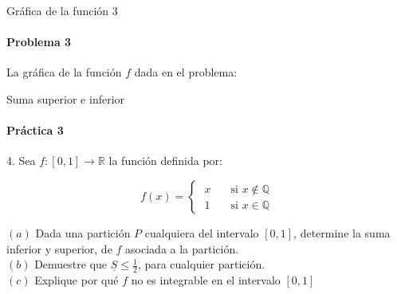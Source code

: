\documentclass{plantillaPPT}
\begin{document}
\begin{frame}{Gráfica de la función 3}
    \framesubtitle{Problema 3}

La gráfica de la función \(f\) dada en el problema:

\begin{center}
\end{center}
    
\end{frame}

\begin{frame}{Suma superior e inferior}
    \framesubtitle{Práctica 3}

4. Sea \(f: [0,1] \to \mathbb{R}\) la función definida por:
\vspace{0.25cm}

\[f(x) = \begin{cases}
    \; x & \quad \text{si } x \notin \mathbb{Q} \\
    \; 1 & \quad \text{si } x \in \mathbb{Q}
\end{cases}\]
\vspace{0.25cm}

\((a)\) Dada una partición \(P\) cualquiera del intervalo \([0,1]\), determine la suma inferior y superior, de \(f\) asociada a la partición. \\
\vspace{0.25cm}
\((b)\) Demuestre que \(\underline{S}\leq\frac{1}{2}\), para cualquier partición. \\
\vspace{0.25cm}
\((c)\) Explique por qué \(f\) no es integrable en el intervalo \([0,1]\)

\end{frame}
\end{document}
